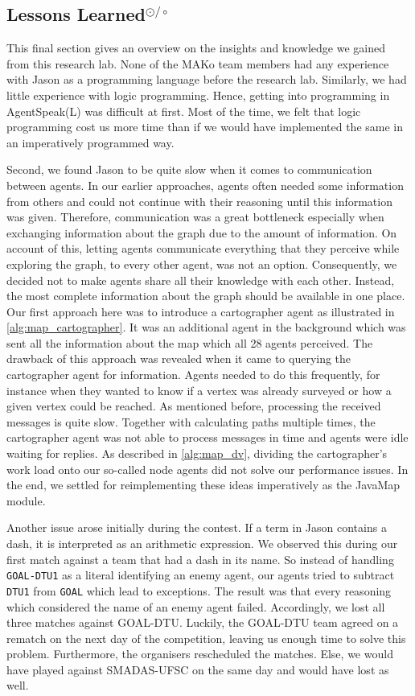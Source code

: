 \subsection[Lessons Learned]{Lessons Learned$^{\odot/\circ}$}\label{con:learned}
This final section gives an overview on the insights and knowledge we gained from this research lab.
None of the MAKo team members had any experience with Jason as a programming language before the research lab.
Similarly, we had little experience with logic programming.
Hence, getting into programming in AgentSpeak(L) was difficult at first.
Most of the time, we felt that logic programming cost us more time than if we would have implemented the same in an imperatively programmed way.

Second, we found Jason to be quite slow when it comes to communication between agents.
In our earlier approaches, agents often needed some information from others and could not continue with their reasoning until this information was given.
Therefore, communication was a great bottleneck especially when exchanging information about the graph due to the amount of information.
On account of this, letting agents communicate everything that they perceive while exploring the graph, to every other agent, was not an option.
Consequently, we decided not to make agents share all their knowledge with each other.
Instead, the most complete information about the graph should be available in one place.
Our first approach here was to introduce a cartographer agent as illustrated in \autoref{alg:map_cartographer}.
It was an additional agent in the background which was sent all the information about the map which all 28 agents perceived.
The drawback of this approach was revealed when it came to querying the cartographer agent for information.
Agents needed to do this frequently, for instance when they wanted to know if a vertex was already surveyed or how a given vertex could be reached.
As mentioned before, processing the received messages is quite slow.
Together with calculating paths multiple times, the cartographer agent was not able to process messages in time and agents were idle waiting for replies.
As described in \autoref{alg:map_dv}, dividing the cartographer's work load onto our so-called node agents did not solve our performance issues.
In the end, we settled for reimplementing these ideas imperatively as the JavaMap module.

Another issue arose initially during the contest.
If a term in Jason contains a dash, it is interpreted as an arithmetic expression.
We observed this during our first match against a team that had a dash in its name.
So instead of handling \texttt{GOAL-DTU1} as a literal identifying an enemy agent, our agents tried to subtract \texttt{DTU1} from \texttt{GOAL} which lead to exceptions.
The result was that every reasoning which considered the name of an enemy agent failed.
Accordingly, we lost all three matches against GOAL-DTU.
Luckily, the GOAL-DTU team agreed on a rematch on the next day of the competition, leaving us enough time to solve this problem.
Furthermore, the organisers rescheduled the matches.
Else, we would have played against SMADAS-UFSC on the same day and would have lost as well.

